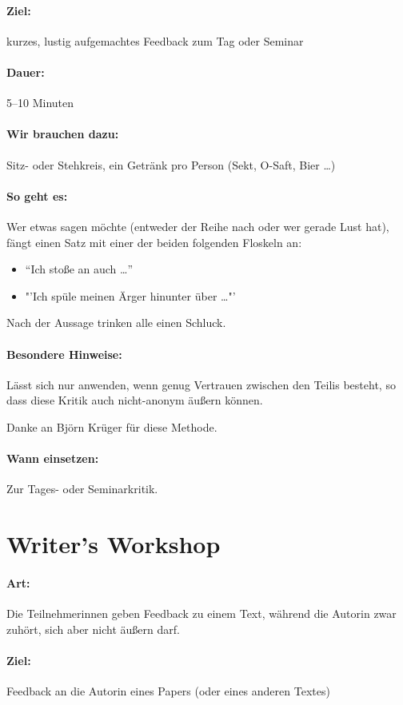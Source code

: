 \paragraph{Ziel:} kurzes, lustig aufgemachtes Feedback zum Tag oder Seminar
\paragraph{Dauer:} 5--10 Minuten
\paragraph{Wir brauchen dazu:} Sitz- oder Stehkreis, ein Getränk pro Person (Sekt, O-Saft, Bier \ldots)
\paragraph{So geht es:} Wer etwas sagen möchte (entweder der Reihe nach oder wer gerade Lust hat), fängt einen Satz mit einer der beiden folgenden Floskeln an:
\begin{itemize}
  \item "`Ich stoße an auch \ldots"'
  \item "'Ich spüle meinen Ärger hinunter über \ldots"'
\end{itemize}
Nach der Aussage trinken alle einen Schluck.

\paragraph{Besondere Hinweise:} Lässt sich nur anwenden, wenn genug Vertrauen zwischen den Teilis besteht, so dass diese Kritik auch nicht-anonym äußern können.

Danke an Björn Krüger für diese Methode.
\paragraph{Wann einsetzen:} Zur Tages- oder Seminarkritik.

\section{Writer's Workshop}
\paragraph{Art:} Die Teilnehmerinnen geben Feedback zu einem Text, während die Autorin zwar zuhört, sich aber nicht äußern darf.
\paragraph{Ziel:} Feedback an die Autorin eines Papers (oder eines anderen Textes)
